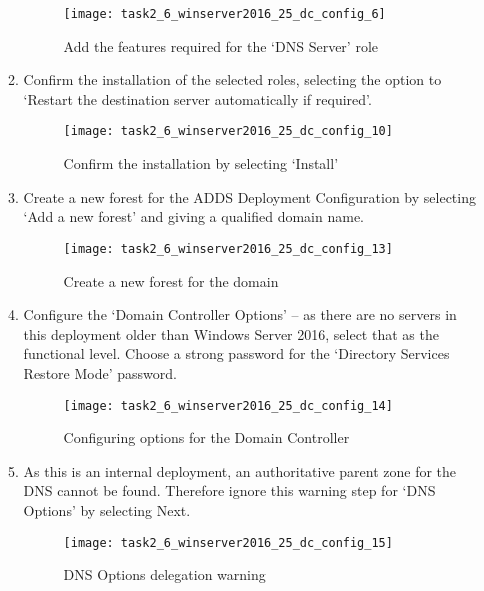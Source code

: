\begin{enumerate}[series=task2methodology3]
\begin{enumerate}[label=(\alph*)]
        \begin{figure}[H]
          \centering
          \captionsetup{skip=2pt}
          \texttt{[image: task2\_6\_winserver2016\_25\_dc\_config\_6]}
          \caption{Add the features required for the `DNS Server' role}
          \label{fig:task2:vspherec_windc2_c6}
        \end{figure}
      \item Confirm the installation of the selected roles, selecting the option to `Restart the destination server automatically if required'.
        \begin{figure}[H]
          \centering
          \captionsetup{skip=2pt}
          \texttt{[image: task2\_6\_winserver2016\_25\_dc\_config\_10]}
          \caption{Confirm the installation by selecting `Install'}
          \label{fig:task2:vspherec_windc2_c10}
        \end{figure}
      \item Create a new forest for the ADDS Deployment Configuration by selecting `Add a new forest' and giving a qualified domain name.
        \begin{figure}[H]
          \centering
          \captionsetup{skip=2pt}
          \texttt{[image: task2\_6\_winserver2016\_25\_dc\_config\_13]}
          \caption{Create a new forest for the domain}
          \label{fig:task2:vspherec_windc2_c13}
        \end{figure}
      \item Configure the `Domain Controller Options' -- as there are no servers in this deployment older than Windows Server 2016, select that as the functional level. Choose a strong password for the `Directory Services Restore Mode' password.
        \begin{figure}[H]
          \centering
          \captionsetup{skip=2pt}
          \texttt{[image: task2\_6\_winserver2016\_25\_dc\_config\_14]}
          \caption{Configuring options for the Domain Controller}
          \label{fig:task2:vspherec_windc2_c14}
        \end{figure}
      \item As this is an internal deployment, an authoritative parent zone for the DNS cannot be found. Therefore ignore this warning step for `DNS Options' by selecting Next.
        \begin{figure}[H]
          \centering
          \captionsetup{skip=2pt}
          \texttt{[image: task2\_6\_winserver2016\_25\_dc\_config\_15]}
          \caption{DNS Options delegation warning}

\end{figure}
\end{enumerate}
\end{enumerate}
